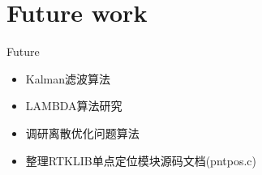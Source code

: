 \section{Future work}
\begin{frame}{Future}
    \begin{itemize}
        \item Kalman滤波算法
        \item LAMBDA算法研究
        \item 调研离散优化问题算法
        \item 整理RTKLIB单点定位模块源码文档(pntpos.c)
    \end{itemize}
\end{frame}